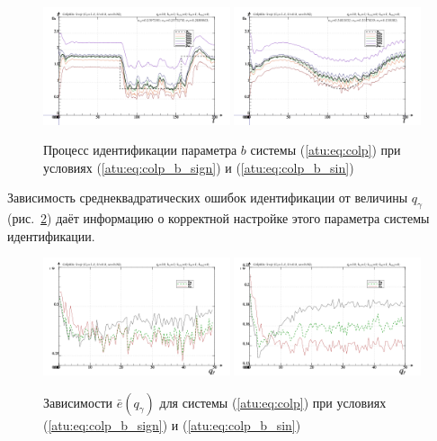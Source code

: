 \begin{figure}[htb!]
\centerline{
  \includegraphics[width=0.49\textwidth]{p/cha/colp/colp_m5p-pl_n_sign.png}
  \includegraphics[width=0.49\textwidth]{p/cha/colp/colp_m5p-pl_n_sin.png}
}
\caption{Процесс идентификации параметра $b$ системы (\ref{atu:eq:colp})
  при условиях (\ref{atu:eq:colp_b_sign}) и (\ref{atu:eq:colp_b_sin})
}
\label{atu:f:colp_id}
\end{figure}

Зависимость среднеквадратических ошибок идентификации от величины $q_\gamma$ (рис.~\ref{atu:f:colp_e_qgamma})
даёт информацию о корректной настройке этого параметра системы идентификации.

\begin{figure}[htb!]
\centerline{
  \includegraphics[width=0.49\textwidth]{p/cha/colp/colp_m5p-p_qg_e_sign.png}
  \includegraphics[width=0.49\textwidth]{p/cha/colp/colp_m5p-p_qg_e_sin.png}
}
  \caption{Зависимости  $\bar{e}(q_\gamma)$ для системы (\ref{atu:eq:colp})
  при условиях (\ref{atu:eq:colp_b_sign}) и (\ref{atu:eq:colp_b_sin})
}
\label{atu:f:colp_e_qgamma}
\end{figure}



